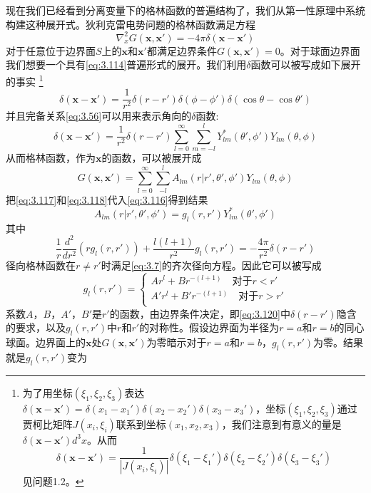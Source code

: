 \documentclass[12pt]{book}
\numberwithin{equation}{chapter}
\numberwithin{figure}{chapter}
\numberwithin{footnote}{page}
\begin{document}
现在我们已经看到分离变量下的格林函数的普遍结构了，我们从第一性原理中系统构建这种展开式。狄利克雷电势问题的格林函数满足方程
\begin{equation}\label{eq:3.116}
    \nabla_x^2 G(\mathbf{x},\mathbf{x'})=-4\pi\delta(\mathbf{x}-\mathbf{x'})
\end{equation}
对于任意位于边界面$S$上的$\mathbf{x}$和$\mathbf{x'}$都满足边界条件$G(\mathbf{x},\mathbf{x'})=0$。对于球面边界面我们想要一个具有\autoref{eq:3.114}普遍形式的展开。我们利用$\delta$函数可以被写成如下展开的事实
\footnote{为了用坐标$(\xi_1,\xi_2,\xi_3)$表达$\delta(\mathbf{x}-\mathbf{x'})=\delta(x_1-x_1')\delta(x_2-x_2')\delta(x_3-x_3')$，坐标$(\xi_1,\xi_2,\xi_3)$通过贾柯比矩阵$J(x_i,\xi_i)$联系到坐标$(x_1,x_2,x_3)$，我们注意到有意义的量是$\delta(\mathbf{x}-\mathbf{x'})d^3x$。从而
$$\delta(\mathbf{x}-\mathbf{x'})=\frac{1}{|J(x_i,\xi_i)|}\delta(\xi_1-\xi_1')\delta(\xi_2-\xi_2')\delta(\xi_3-\xi_3')$$
见问题1.2。}
$$\delta(\mathbf{x}-\mathbf{x'})=\frac{1}{r^2}\delta(r-r')\delta(\phi-\phi')\delta(\cos\theta-\cos\theta')$$
并且完备关系\autoref{eq:3.56}可以用来表示角向的$\delta$函数:
\begin{equation}\label{eq:3.117}
    \delta(\mathbf{x}-\mathbf{x'})=\frac{1}{r^2}\delta(r-r')\sum_{l=0}^\infty\sum_{m=-l}^l Y_{lm}^*(\theta',\phi')Y_{lm}(\theta,\phi)
\end{equation}
从而格林函数，作为$\mathbf{x}$的函数，可以被展开成
\begin{equation}\label{eq:3.118}
    G(\mathbf{x},\mathbf{x'})=\sum_{l=0}^\infty\sum_{-l}^l A_{lm}(r|r',\theta',\phi')Y_{lm}(\theta,\phi)
\end{equation}
把\autoref{eq:3.117}和\autoref{eq:3.118}代入\autoref{eq:3.116}得到结果
\begin{equation}\label{eq:3.119}
    A_{lm}(r|r',\theta',\phi')=g_l(r,r')Y_{lm}^*(\theta',\phi')
\end{equation}
其中
\begin{equation}\label{eq:3.120}
    \frac{1}{r}\frac{d^2}{dr^2}(rg_l(r,r'))+\frac{l(l+1)}{r^2}g_l(r,r')=-\frac{4\pi}{r^2}\delta(r-r')
\end{equation}
径向格林函数在$r\neq r'$时满足\autoref{eq:3.7}的齐次径向方程。因此它可以被写成
$$g_l(r,r')=
\begin{cases}
   Ar^l+Br^{-(l+1)}\quad \mbox{对于}r<r'\\
   A'r^l+B'r^{-(l+1)}\quad \mbox{对于}r>r'\\
\end{cases}$$
系数$A$，$B$，$A'$，$B'$是$r'$的函数，由边界条件决定，即\autoref{eq:3.120}中$\delta(r-r')$隐含的要求，以及$g_l(r,r')$中$r$和$r'$的对称性。假设边界面为半径为$r=a$和$r=b$的同心球面。边界面上的$\mathbf{x}$处$G(\mathbf{x},\mathbf{x'})$为零暗示对于$r=a$和$r=b$，$g_l(r,r')$为零。结果就是$g_l(r,r')$变为
\end{document}
